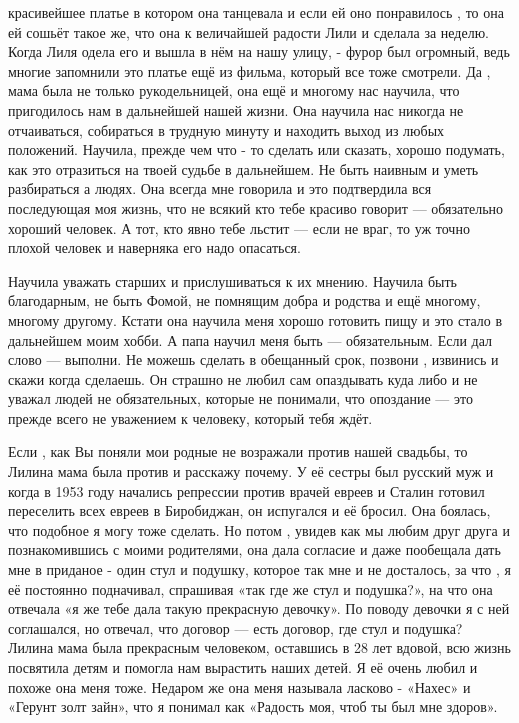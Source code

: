 красивейшее платье в котором она танцевала и если ей оно понравилось , то она
ей сошьёт такое же, что она к величайшей радости Лили и сделала за  неделю.
Когда Лиля одела  его и вышла в нём на нашу улицу, - фурор был огромный, ведь
многие запомнили это платье ещё из фильма,  который все тоже смотрели.  Да ,
мама была не только рукодельницей, она ещё и многому нас научила, что
пригодилось нам в дальнейшей нашей жизни.  Она научила нас никогда не
отчаиваться, собираться в трудную минуту и находить выход из любых  положений.
Научила, прежде чем что - то сделать или сказать,  хорошо подумать, как это
отразиться на твоей судьбе в дальнейшем. Не быть наивным и уметь  разбираться а
людях. Она всегда мне говорила и это подтвердила вся последующая моя  жизнь,
что не всякий кто тебе красиво говорит — обязательно хороший человек. А тот,
кто явно тебе льстит —  если не враг, то уж точно плохой человек и наверняка
его надо опасаться. 

Научила уважать старших и прислушиваться  к их мнению. Научила быть
благодарным, не быть Фомой, не помнящим добра и родства и ещё многому, многому
другому. Кстати она научила меня хорошо готовить пищу и это стало в дальнейшем
моим хобби. А папа научил меня быть — обязательным. Если дал слово — выполни.
Не можешь сделать в обещанный срок, позвони , извинись и скажи когда сделаешь.
Он страшно не любил сам опаздывать куда либо и не уважал людей не обязательных,
которые  не понимали, что опоздание — это  прежде всего  не уважением к
человеку, который тебя ждёт.

Если , как Вы поняли мои родные не возражали против нашей свадьбы, то Лилина
мама была против и расскажу почему. У её сестры был русский муж и когда в 1953
году начались репрессии против врачей евреев и Сталин готовил переселить всех
евреев в Биробиджан, он испугался и её бросил. Она боялась, что подобное я могу
тоже сделать. Но потом , увидев как мы любим друг друга и познакомившись с
моими родителями, она дала согласие и даже пообещала дать мне в приданое -
один стул и подушку, которое так мне и не досталось, за что , я её постоянно
подначивал, спрашивая «так где же стул и подушка?», на что она отвечала «я же
тебе дала такую прекрасную девочку». По поводу девочки я с ней соглашался, но
отвечал, что  договор — есть договор, где стул и подушка? Лилина мама была
прекрасным человеком, оставшись в 28 лет вдовой, всю жизнь  посвятила детям и
помогла нам  вырастить наших детей. Я её очень любил и похоже она меня тоже.
Недаром же она меня называла ласково - «Нахес» и «Герунт золт зайн», что  я
понимал как «Радость моя, чтоб ты был мне здоров».

